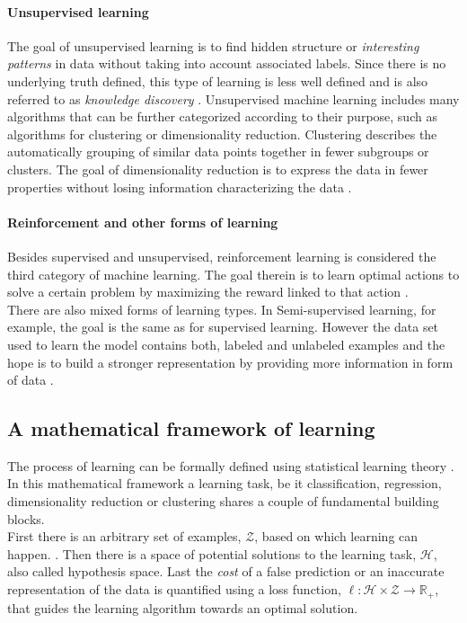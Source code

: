 \paragraph{Unsupervised learning}
The goal of unsupervised learning is to find hidden structure or \textit{interesting patterns} in data without taking into account associated labels. Since there is no underlying truth defined, this type of learning is less well defined and is also referred to as \textit{knowledge discovery} \cite{Murphy2012}. Unsupervised machine learning includes many algorithms that can be further categorized according to their purpose, such as algorithms for clustering or dimensionality reduction. Clustering describes the automatically grouping of similar data points together in fewer subgroups or clusters. The goal of dimensionality reduction is to express the data in fewer properties without losing information characterizing the data \cite{Cunningham2014}. 

\paragraph{Reinforcement and other forms of learning}
Besides supervised and unsupervised, reinforcement learning is considered the third category of machine learning. The goal therein is to learn optimal actions to solve a certain problem by maximizing the reward linked to that action \cite{Murphy2012}.\\
There are also mixed forms of learning types. In Semi-supervised learning, for example, the goal is the same as for supervised learning. However the data set used to learn the model contains both, labeled and unlabeled examples and the hope is to build a stronger representation by providing more information in form of data \cite{Burkov2019}. 

\subsection{A mathematical framework of learning}
The process of learning can be formally defined using statistical learning theory \cite{Von_luxburg2011,Shalev2014}. In this mathematical framework a learning task, be it classification, regression, dimensionality reduction or clustering shares a couple of fundamental building blocks. \\
First there is an arbitrary set of examples, $\mathcal{Z}$, based on which learning can happen. . Then there is a space of potential solutions to the learning task, $\mathcal{H}$, also called hypothesis space. Last the \textit{cost} of a false prediction or an inaccurate representation of the data is quantified using a loss function, $\ell:\mathcal{H}\times\mathcal{Z}\rightarrow\mathbb{R}_+$, that guides the learning algorithm towards an optimal solution.\\

